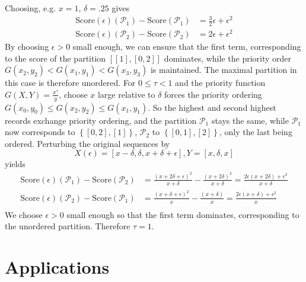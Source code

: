 \documentclass{article}
\theoremstyle{case}
\begin{document}
Choosing, e.g. $x = 1$, $\delta = .25$ gives 
\begin{align*}
\text{Score}\left(\epsilon \right)\left(\mathcal{P}_1 \right) - \text{Score}\left(\mathcal{P}_1 \right) &= \frac{3}{2}\epsilon + \epsilon^2 \\
\text{Score}\left(\epsilon \right)\left(\mathcal{P}_2 \right) - \text{Score}\left(\mathcal{P}_2 \right) &= 2\epsilon + \epsilon^2
\end{align*}
By choosing $\epsilon > 0$ small enough, we can ensure that the first term, corresponding to the score of the partition $\left[ \left[ 1\right], \left[ 0, 2\right]\right]$ dominates, while the priority order $G(x_2, y_2) < G(x_1, y_1) < G(x_3, y_3)$ is maintained. The maximal partition in this case is therefore unordered.
For $ 0 \leq \tau < 1$ and the priority function $G(X,Y) = \frac{x^{\tau}}{y}$, choose $x$ large relative to $\delta$ forces the priority ordering $G(x_0, y_0) \leq G(x_2, y_2) \leq G(x_1, y_1)$. So the  highest and second highest records exchange priority ordering, and the partition $\mathcal{P}_1$ stays the same, while $\mathcal{P}_1$ now corresponds to $\left\lbrace \left[ 0, 2\right], \left[ 1\right]\right\rbrace$, $\mathcal{P}_2$ to $\left\lbrace \left[ 0, 1\right], \left[ 2\right]\right\rbrace$, only the last being ordered. Perturbing the original sequences by
\[
X\left(\epsilon\right) = \left[ x-\delta, \delta, x + \delta + \epsilon\right], Y = \left[ x, \delta, x\right]
\]
yields
\begin{align*}
\text{Score}\left(\epsilon \right)\left(\mathcal{P}_1 \right) - \text{Score}\left(\mathcal{P}_2 \right) &= \frac{\left( x + 2\delta + \epsilon\right)^2}{x + \delta}  - \frac{\left( x + 2\delta\right)^2}{x + \delta} = \frac{2\epsilon\left( x + 2\delta\right) + \epsilon^2}{x + \delta} \\
\text{Score}\left(\epsilon \right)\left(\mathcal{P}_2 \right) - \text{Score}\left(\mathcal{P}_1 \right) &= \frac{\left( x + \delta + \epsilon\right)^2}{x} - \frac{\left( x + \delta\right)}{x} = \frac{2\epsilon\left( x + \delta \right) + \epsilon^2}{x} \\
\end{align*}
We choose $\epsilon > 0$ small enough so that the first term dominates, corresponding to the unordered partition. Therefore $\tau = 1$.

\section{Applications}
\end{document}
